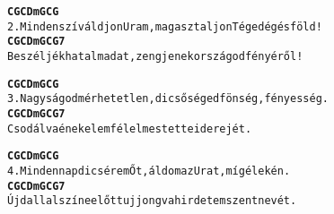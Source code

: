 \cleardoublepage
{}
\kottastart
{}
\kottaend
\begin{minipage}{\textwidth}
\begin{alltt}
\textbf{    C          G        C    Dm           G    C      G}
2. Minden szív áldjon Uram, magasztaljon Téged ég és föld!
\textbf{    C         G      C    Dm       G         C    G7}
   Beszéljék hatalmadat, zengjenek országod fényéről!
\end{alltt}
\vspace{0.0cm}
\versszakspacing
\end{minipage}
\begin{minipage}{\textwidth}
\begin{alltt}
\textbf{    C         G       C    Dm         G       C     G}
3. Nagyságod mérhetetlen, dicsőséged fönség, fényesség.
\textbf{     C      G     C   Dm       G      C   G7}
   Csodálva énekelem félelmes tetteid erejét.
\end{alltt}
\vspace{0.0cm}
\versszakspacing
\end{minipage}
\begin{minipage}{\textwidth}
\begin{alltt}
\textbf{    C          G       C   Dm       G         C    G}
4. Minden nap dicsérem Őt, áldom az Urat, míg élek én.
\textbf{   C           G     C   Dm        G         C      G7}
   Új dallal színe előtt ujjongva hirdetem szent nevét.
\end{alltt}
\vspace{0.0cm}
\versszakspacing
\end{minipage}
~\vspace{1.0cm}
\newline
